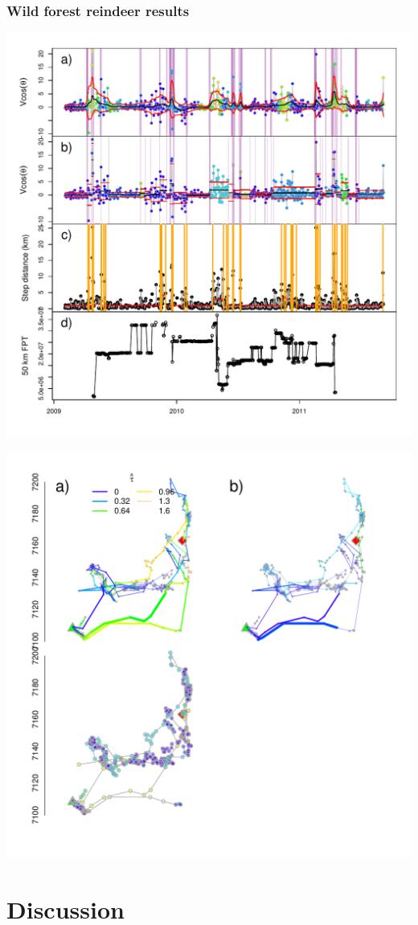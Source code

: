 \documentclass[10pt]{article}\usepackage{graphicx, color}
\newenvironment{knitrout}{}{} %
\newcommand{\bc}{\begin{center}}
\newcommand{\ec}{\end{center}}
\begin{document}
\subsubsection{Wild forest reindeer results}
\bc
\begin{knitrout}
\color{fgcolor}
\includegraphics[width=.7\textwidth]{figure/WFRResults1} 

\includegraphics[width=.7\textwidth]{figure/WFRResults2} 

\end{knitrout}

\ec
\section{Discussion}
\end{document}
